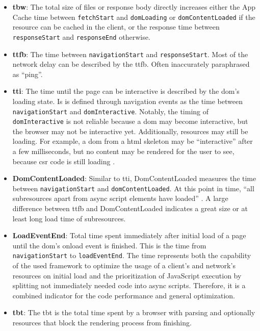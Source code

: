 \documentclass[a4paper, 12pt]{article}
\begin{document}
\begin{itemize}
  \item \textbf{\acrfull{tbw}}: The total size of files or response body directly increases either the App Cache time between \verb|fetchStart| and \verb|domLoading| or \verb|domContentLoaded| if the resource can be cached in the client, or the response time between \verb|responseStart| and \verb|responseEnd| otherwise.
  \item \textbf{\acrfull{ttfb}}: The time between \verb|navigationStart| and \verb|responseStart|.
  Most of the network delay can be described by the \acrshort{ttfb}.
  Often inaccurately paraphrased as \enquote{ping}.
  \item \textbf{\acrfull{tti}}: The time until the page can be interactive is described by the \acrshort{dom}'s loading state.
  Is is defined through navigation events as the time between \verb|navigationStart| and \verb|domInteractive|.
  Notably, the timing of \verb|domInteractive| is not reliable because a \acrshort{dom} may become interactive, but the browser may not be interactive yet.
  Additionally, resources may still be loading.
  For example, a \acrshort{dom} from a \acrshort{html} skeleton may be \enquote{interactive} after a few milliseconds, but no content may be rendered for the user to see, because \acrshort{csr} code is still loading \citep{htmlLivingStandard}.
  \item \textbf{DomContentLoaded}: Similar to \acrshort{tti}, DomContentLoaded measures the time between \verb|navigationStart| and \verb|domContentLoaded|.
  At this point in time, \enquote{all subresources apart from async script elements have loaded} \citep{htmlLivingStandard}.
  A large difference between \acrshort{ttfb} and DomContentLoaded indicates a great size or at least long load time of subresources.
  \item \textbf{LoadEventEnd}: Total time spent immediately after initial load of a page until the \acrshort{dom}'s onload event is finished.
  This is the time from \\
  \verb|navigationStart| to \verb|loadEventEnd|.
  The time represents both the capability of the used framework to optimize the usage of a client's and network's resources on initial load and the prioritization of JavaScript execution by splitting not immediately needed code into async scripts.
  Therefore, it is a combined indicator for the code performance and general optimization.
  \item \textbf{\acrfull{tbt}}: The \acrshort{tbt} is the total time spent by a browser with parsing and optionally resources that block the rendering process from finishing.

\end{itemize}
\end{document}
